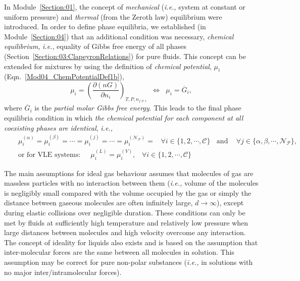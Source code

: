 \documentclass[12pts,a4paper,amsmath,amssymb,floatfix]{article}%
\newcommand{\frc}{\displaystyle\frac}
\newcommand{\ie}{{\it i.e., }}
\newcommand{\Partial}[3][error]{\left(\frc{\partial #1}{\partial #2}\right)_{#3}}
\newcommand{\mfr}[3][error]{#1_{#2}^{\left(#3\right)}}
\begin{document}
In Module~\ref{Section:01}, the concept of {\it mechanical} (\ie system at constant or uniform pressure) and {\it thermal} (from the Zeroth law) equilibrium were introduced. In order to define phase equilibria, we established (in Module~\ref{Section:04}) that an additional condition was necessary, {\it chemical equilibrium}, \ie equality of Gibbs free energy of all phases (Section~\ref{Section:03:ClapeyronRelations}) for pure fluids. This concept can be extended for mixtures by using the definition of {\it chemical potential}, $\mu_{i}$ (Eqn.~\ref{Mod04_ChemPotentialDef1b}),
         \begin{displaymath}
            \mu_{i} = \Partial[(nG)]{n_{i}}{T,P,n_{j\ne i}} \;\;\Longleftrightarrow\;\; \mu_{i} = \overline{G}_{i},
         \end{displaymath}
where $\overline{G}_{i}$ is the {\it partial molar Gibbs free energy}. This leads to the final phase equilibria condition in which {\it the chemical potential for each component at all coexisting phases are identical}, \ie 
         \begin{eqnarray}
            && \mfr[\mu]{i}{\alpha} = \mfr[\mu]{i}{\beta} = \cdots =  \mfr[\mu]{i}{j} = \cdots = \mfr[\mu]{i}{\mathcal{N}_{\mathcal{P}}} = \;\;\;\forall i\in\{1,2,\cdots,\mathcal{C}\}\;\; \text{ and }\;\;\; \forall j\in\{\alpha,\beta,\cdots,\mathcal{N}_{\mathcal{P}}\}, \nonumber \\
            &&  \text{or for VLE systems: }\;\;\;\; \mfr[\mu]{i}{L} = \mfr[\mu]{i}{V},\;\;\;\forall i\in\{1,2,\cdots,\mathcal{C}\} \nonumber 
         \end{eqnarray}

\medskip

The main assumptions for ideal gas behaviour assumes that molecules of gas are massless particles with no interaction between them (\ie volume of the molecules is negligibly small compared with the volume occupied by the gas or simply the distance between gaseous molecules are often infinitely large, $d\rightarrow \infty$), except during elastic collisions over negligible duration. These conditions can only be met by fluids at sufficiently high temperature and relatively low pressure when large distances between molecules and high velocity overcome any interaction. The concept of ideality for liquids also exists and is based on the assumption that inter-molecular forces are the same between all molecules in solution. This assumption may be correct for pure non-polar substances (\ie in solutions with no major inter/intramolecular forces).
\end{document}
